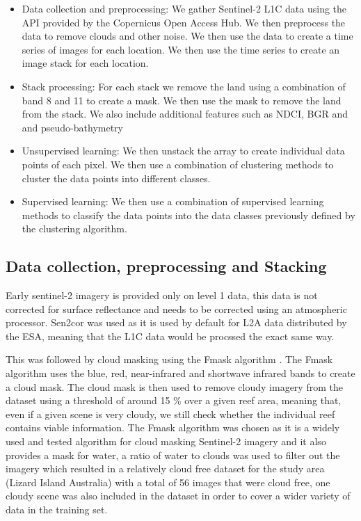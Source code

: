 \documentclass[journal,article,submit,pdftex,moreauthors]{Definitions/mdpi}
\begin{document}
\begin{itemize}
	\item Data collection and preprocessing: We gather Sentinel-2 L1C data using the API provided by the Copernicus Open Access Hub. We then preprocess the data to remove clouds and other noise. We then use the data to create a time series of images for each location. We then use the 
	time series to create an image stack for each location.
	\item Stack processing: For each stack we remove the land using a combination of band 8 and 11 to create a mask. We then use the mask to remove the land from the stack. We also include additional features such as NDCI, BGR and and pseudo-bathymetry
	\item Unsupervised learning: We then unstack the array to create individual data points of each pixel. We then use a combination of clustering methods to cluster the data points into different classes. 
	\item Supervised learning: We then use a combination of supervised learning methods to classify the data points into the data classes previously defined by the clustering algorithm.
\end{itemize}

\subsection*{Data collection, preprocessing and Stacking}
Early sentinel-2 imagery is provided only on level 1 data, this data is not corrected for surface reflectance and needs to be corrected using an atmospheric processor. Sen2cor was 
used as it is used by default for L2A data distributed by the ESA, meaning that the L1C data would be procssed the exact same way. 

This was followed by cloud masking using the Fmask algorithm \cite{Zhe2012}. The Fmask algorithm uses the blue, red, near-infrared and shortwave infrared bands to create a cloud mask. 
The cloud mask is then used to remove cloudy imagery from the dataset using a threshold of around 15
\% over a given reef area, meaning that, even if a given scene is very cloudy, we still check whether the individual reef contains viable information. 
The Fmask algorithm was chosen as it is a widely used and tested algorithm for cloud masking Sentinel-2 imagery and it also provides a mask for water, a ratio of water to clouds was used to filter out the imagery which resulted 
in a relatively cloud free dataset for the study area (Lizard Island Australia) with a total of 56 images that were cloud free, one cloudy scene was also included in the dataset in order to cover a wider variety of data in the training set.
\end{document}
